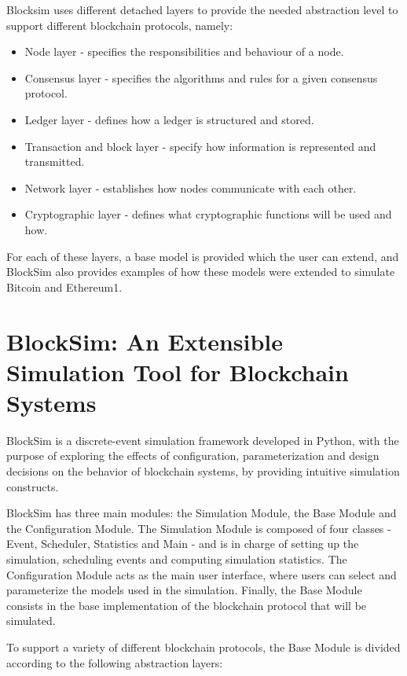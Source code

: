 Blocksim uses different detached layers to provide the needed abstraction level to support different blockchain protocols, namely:

\begin{itemize}
	\item Node layer - specifies the responsibilities and behaviour of a node.
	\item Consensus layer - specifies the algorithms and rules for a given consensus protocol.
	\item Ledger layer - defines how a ledger is structured and stored.
	\item Transaction and block layer - specify how information is represented and transmitted.
	\item Network layer - establishes how nodes communicate with each other.
	\item Cryptographic layer - defines what cryptographic functions will be used and how.
\end{itemize}

For each of these layers, a base model is provided which the user can extend, and BlockSim also provides examples of how these models were extended to simulate Bitcoin and Ethereum1.


\section{BlockSim: An Extensible Simulation Tool for Blockchain Systems}
\label{sec:blocksim2}

BlockSim \cite{blocksim2} is a discrete-event simulation framework developed in Python, with the purpose of exploring the effects of configuration, parameterization and design decisions on the behavior of blockchain systems, by providing intuitive simulation constructs.

BlockSim has three main modules: the Simulation Module, the Base Module and the Configuration Module. The Simulation Module is composed of four classes - Event, Scheduler, Statistics and Main - and is in charge of setting up the simulation, scheduling events and computing simulation statistics. The Configuration Module acts as the main user interface, where users can select and parameterize the models used in the simulation. Finally, the Base Module consists in the base implementation of the blockchain protocol that will be simulated.

To support a variety of different blockchain protocols, the Base Module is divided according to the following abstraction layers:

